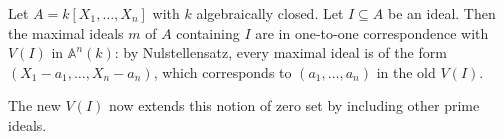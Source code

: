 Let $A = k[X_1, \ldots, X_n]$ with $k$ algebraically closed. Let $I \subseteq A$
be an ideal. Then the maximal ideals $m$ of  $A$ containing $I$ are in one-to-one
correspondence with $V(I)$ in $\mathbb{A}^n(k)$: by Nulstellensatz, every
maximal ideal is of the form $(X_1 - a_1, \ldots, X_n - a_n)$, which corresponds
to $(a_1, \ldots, a_n)$ in the old $V(I)$.

The new $V(I)$ now extends this notion of zero set by including other prime
ideals.
